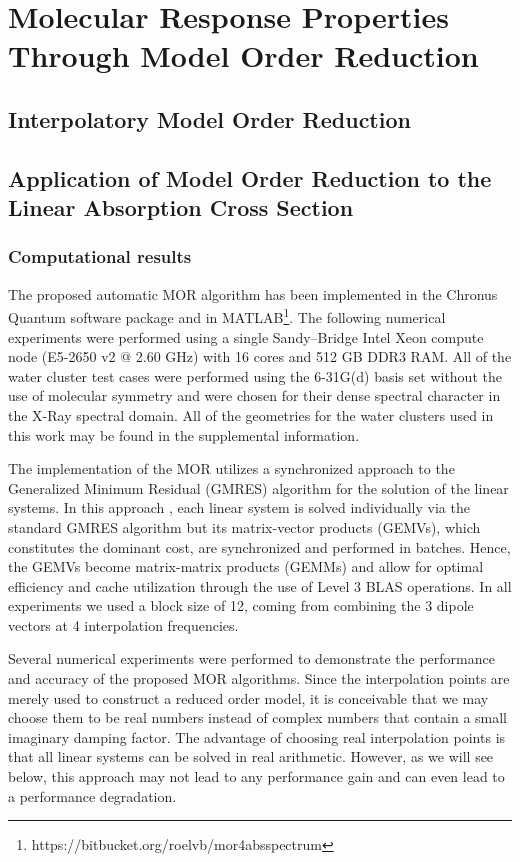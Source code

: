 \chapter{Molecular Response Properties Through Model Order Reduction}

\section{Interpolatory Model Order Reduction}

\section{Application of Model Order Reduction to the Linear Absorption 
  Cross Section}

\subsection{Computational results}
\label{sec:MORresults}

The proposed automatic MOR algorithm has been implemented in the Chronus
Quantum software package\cite{chronusq_beta} and in
MATLAB\footnote[4]{https://bitbucket.org/roelvb/mor4absspectrum}.
The following numerical experiments were performed using a single
Sandy--Bridge Intel Xeon compute node (E5-2650 v2 @ 2.60 GHz) with 16
cores and 512 GB DDR3 RAM. All of the water cluster test cases were performed
using the 6-31G(d) basis set without the use of molecular symmetry and
were chosen for their dense spectral character in the X-Ray spectral domain.
All of the geometries for the water clusters used in this work may be
found in the supplemental information.

The implementation of the MOR utilizes a synchronized approach to the
Generalized Minimum Residual (GMRES)\cite{Walker88_152} algorithm for the
solution of the linear systems. In this approach \cite{shak2016}, each linear
system is solved individually via the standard GMRES algorithm but its
matrix-vector products (GEMVs), which constitutes the dominant cost, are synchronized
and performed in batches. Hence, the GEMVs become matrix-matrix
products (GEMMs) and allow for optimal efficiency and cache utilization through
the use of Level 3 BLAS operations. In all experiments we used a block size of
12, coming from combining the 3 dipole vectors at 4 interpolation frequencies.

Several numerical experiments were performed to demonstrate the performance and accuracy of the proposed MOR algorithms. Since the interpolation points are merely used to construct a reduced order model, it is conceivable that we may choose them to be real numbers instead of complex numbers that contain a small imaginary damping factor.  The advantage of choosing real interpolation points is that all linear systems can be solved in real arithmetic. However, as we will see below, this approach may not lead to any performance gain and can even lead to a performance degradation.


